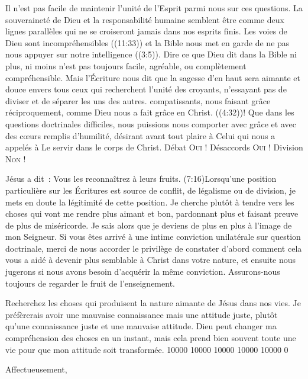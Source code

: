 \begin{pocketpar}{}
\begin{digestpar}{}
Il n'est pas facile de maintenir l'unité de l'Esprit parmi nous sur ces questions.
 La souveraineté de Dieu et la responsabilité humaine semblent être
 comme deux lignes parallèles qui ne se croiseront jamais dans nos esprits finis.
 Les voies de Dieu sont \og incompréhensibles \fg{} ((11:33))
 et la Bible nous met en garde de \og ne pas nous appuyer sur notre intelligence \fg{}
 ((3:5)).
 Dire ce que Dieu dit dans la Bible \ocadr ni plus, ni moins \fcadr{} n'est pas
 toujours facile, agréable, ou complètement compréhensible.
 Mais l'Écriture nous dit que la sagesse d'en haut sera aimante
 et douce envers tous ceux qui recherchent l'unité des croyants,
 n'essayant pas de diviser et de séparer les uns des autres.
 compatissants, nous faisant grâce réciproquement,
 comme Dieu nous a fait grâce en Christ. ((4:32))!
 Que dans les questions doctrinales difficiles, nous puissions nous comporter
 avec grâce et avec des cœurs remplis d'humilité, désirant avant tout
 plaire à Celui qui nous a appelés à Le servir dans le corps de Christ.
 Débat \ocadr \textsc{Oui} !
 Désaccords \ocadr \textsc{Oui} !
 Division \ocadr \textsc{Non} !
\end{digestpar}
\end{pocketpar}

Jésus a dit~: \og Vous les reconnaîtrez à leurs fruits. \fg{}
 (7:16)Lorsqu'une position particulière
 sur les Écritures est source de conflit, de légalisme ou de division,
 je mets en doute la légitimité de cette position.
 Je cherche plutôt à tendre vers les choses qui vont me rendre plus aimant et bon,
 pardonnant plus et faisant preuve de plus de miséricorde.
 Je sais alors que je deviens de plus en plus à l'image de mon Seigneur.
Si vous êtes arrivé à une intime conviction unilatérale sur question doctrinale,
 merci de nous accorder le privilège de constater d'abord comment cela
 vous a aidé à devenir plus semblable à Christ dans votre nature,
 et ensuite nous jugerons si nous avons besoin d'acquérir la même conviction.
 Assurons-nous toujours de regarder le fruit de l'enseignement.

\begin{pocketpar}{}
Recherchez les choses qui produisent la nature \digestlinebreak
 aimante de Jésus dans nos vies.
 Je préfèrerais avoir une mauvaise connaissance mais une attitude juste,
 plutôt qu'une connaissance juste et une mauvaise \digestlinebreak
 attitude.
 Dieu peut changer ma compréhension des choses en un instant,
 mais cela prend bien \digestlinebreak
 souvent toute une vie pour que mon attitude \digestlinebreak
 soit transformée.
 \begingroup{} 10000 10000 10000 10000 10000 0
 \par\endgroup
\end{pocketpar}


\nobreak
\vspace{5mm}
Affectueusement,

\nobreak
\signature{Chuck Smith}

\closechapter

